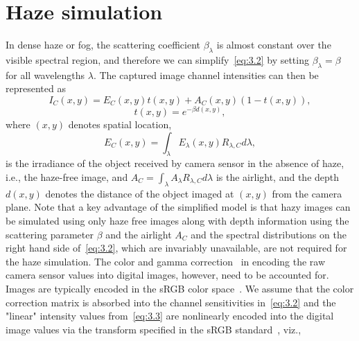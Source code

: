 \section{Haze simulation}
\label{sec:3.3.simu}
In dense haze or fog, the scattering coefficient $\beta_{\lambda}$ is almost constant over the visible spectral region, and therefore we can simplify~\eqref{eq:3.2} by setting $\beta_{\lambda} = \beta$ for all wavelengths $\lambda$. The captured image channel intensities can then be represented as 
\begin{equation}
I_{C}(x,y) = E_{C}(x,y) t(x,y) +A_{C}(x,y) (1-t(x,y)),
\label{eq:3.3}
\end{equation}
\begin{equation*}
t(x,y) = e^{-\beta d(x,y)},
\end{equation*}
where $(x,y)$ denotes spatial location, 
\[
E_{C}(x,y) = \int_{\lambda}{E_{\lambda}(x,y) R_{\lambda,C}}d\lambda,
\]
is the irradiance of the object received by camera sensor in the absence of haze, i.e., the haze-free image, and $A_{C} = \int_{\lambda}{A_{\lambda}R_{\lambda,C}}d\lambda$ is the airlight, and the depth $d(x,y)$ denotes the distance of the object imaged at $(x,y)$ from the camera plane. Note that a key advantage of the simplified model is that hazy images can be simulated using only haze free images along with depth information using the scattering parameter $\beta$ and the airlight $A_{C}$ and the spectral distributions on the right hand side of~\eqref{eq:3.2}, which are invariably unavailable, are not required for the haze simulation. The color and gamma correction~\cite{GSharma:crcdcihbk02} in encoding the raw camera sensor values into digital images, however, need to be accounted for. Images are typically encoded in the 
sRGB color space~\cite{international1999multimedia}. We assume that the color correction matrix is absorbed into the channel sensitivities in~\eqref{eq:3.2} and the "linear" intensity values from~\eqref{eq:3.3} are nonlinearly encoded into the digital image values via the transform specified in the sRGB standard~\cite{international1999multimedia}, viz.,
